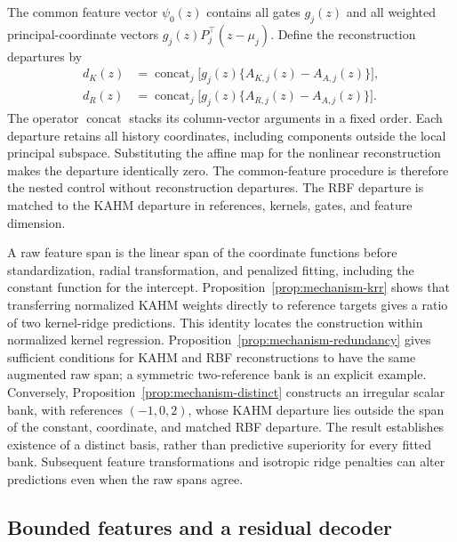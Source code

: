 The common feature vector $\psi_0(z)$ contains all gates $g_j(z)$ and
all weighted principal-coordinate vectors $g_j(z)P_j^\top(z-\mu_j)$.
Define the reconstruction departures by
\begin{equation}
 \begin{split}
 d_K(z)&=\operatorname{concat}_{j}
       \bigl[g_j(z)\{A_{K,j}(z)-A_{A,j}(z)\}\bigr],\\
 d_R(z)&=\operatorname{concat}_{j}
       \bigl[g_j(z)\{A_{R,j}(z)-A_{A,j}(z)\}\bigr].
 \end{split}
 \label{eq:mechanism-main-departures}
\end{equation}
The operator $\operatorname{concat}$ stacks its column-vector arguments
in a fixed order. Each departure retains all history coordinates,
including components outside the local principal subspace. Substituting
the affine map for the nonlinear reconstruction makes the departure
identically zero. The common-feature procedure is therefore the nested
control without reconstruction departures. The RBF departure is matched
to the KAHM departure in references, kernels, gates, and feature dimension.

A raw feature span is the linear span of the coordinate functions before
standardization, radial transformation, and penalized fitting, including
the constant function for the intercept. Proposition~\ref{prop:mechanism-krr}
shows that transferring normalized KAHM weights directly to reference
targets gives a ratio of two kernel-ridge predictions. This identity
locates the construction within normalized kernel regression.
Proposition~\ref{prop:mechanism-redundancy} gives sufficient conditions
for KAHM and RBF reconstructions to have the same augmented raw span;
a symmetric two-reference bank is an explicit example. Conversely,
Proposition~\ref{prop:mechanism-distinct} constructs an irregular scalar
bank, with references $(-1,0,2)$, whose KAHM departure lies outside the
span of the constant, coordinate, and matched RBF departure. The result
establishes existence of a distinct basis, rather than predictive
superiority for every fitted bank. Subsequent feature transformations
and isotropic ridge penalties can alter predictions even when the raw
spans agree.

\subsection{Bounded features and a residual decoder}

